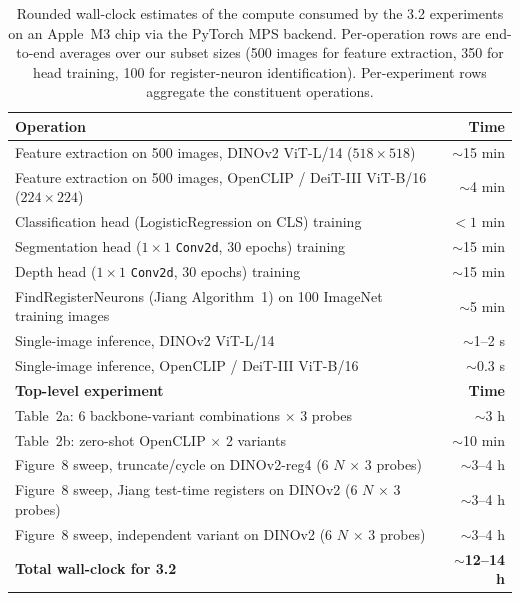 \begin{table}[htbp]
\centering
\caption{Rounded wall-clock estimates of the compute consumed by the 3.2 experiments on an Apple~M3 chip via the PyTorch MPS backend. Per-operation rows are end-to-end averages over our subset sizes (500 images for feature extraction, 350 for head training, 100 for register-neuron identification). Per-experiment rows aggregate the constituent operations.}
\label{tab:timings}
\begin{tabular}{lr}
\toprule
\textbf{Operation} & \textbf{Time} \\
\midrule
Feature extraction on 500 images, DINOv2 ViT-L/14 ($518{\times}518$)         & $\sim$15 min \\
Feature extraction on 500 images, OpenCLIP / DeiT-III ViT-B/16 ($224{\times}224$) & $\sim$4 min \\
Classification head (LogisticRegression on CLS) training                     & $<1$ min \\
Segmentation head ($1{\times}1$ \texttt{Conv2d}, 30 epochs) training         & $\sim$15 min \\
Depth head ($1{\times}1$ \texttt{Conv2d}, 30 epochs) training                & $\sim$15 min \\
FindRegisterNeurons (Jiang Algorithm~1) on 100 ImageNet training images       & $\sim$5 min \\
Single-image inference, DINOv2 ViT-L/14                                       & $\sim$1--2 s \\
Single-image inference, OpenCLIP / DeiT-III ViT-B/16                          & $\sim$0.3 s \\
\midrule
\textbf{Top-level experiment} & \textbf{Time} \\
\midrule
Table~2a: 6 backbone-variant combinations $\times$ 3 probes                   & $\sim$3 h \\
Table~2b: zero-shot OpenCLIP $\times$ 2 variants                              & $\sim$10 min \\
Figure~8 sweep, truncate/cycle on DINOv2-reg4 (6 $N$ $\times$ 3 probes)       & $\sim$3--4 h \\
Figure~8 sweep, Jiang test-time registers on DINOv2 (6 $N$ $\times$ 3 probes) & $\sim$3--4 h \\
Figure~8 sweep, independent variant on DINOv2 (6 $N$ $\times$ 3 probes)       & $\sim$3--4 h \\
\midrule
\textbf{Total wall-clock for 3.2}                                            & \textbf{$\sim$12--14 h} \\
\bottomrule
\end{tabular}
\end{table}
